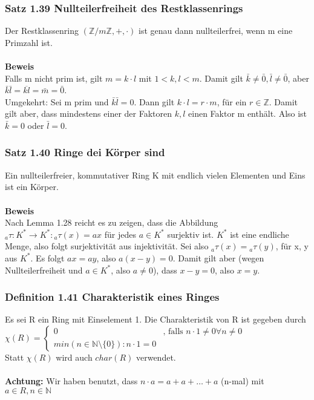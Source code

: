 \documentclass{article}
\newcommand{\N}{\mathbb{N}}
\newcommand{\Z}{\mathbb{Z}}
\begin{document}
\subsubsection{Satz 1.39 Nullteilerfreiheit des Restklassenrings}
Der Restklassenring $(\Z/m\Z, +, \cdot)$ ist genau dann nullteilerfrei, wenn m eine Primzahl ist.\\
\\
\textbf{Beweis}\\
Falls m nicht prim ist, gilt $m = k \cdot l$ mit $1 < k, l < m$. Damit gilt $\bar{k} \neq \bar{0}, \bar{l} \neq \bar{0}$, aber $\bar{k} \bar{l}= \overline{kl} = \bar{m} = \bar{0}$.\\Umgekehrt: Sei m prim und $\bar{k} \bar{l} = 0$. Dann gilt $k \cdot l= r \cdot m$, für ein $r \in \Z$. Damit gilt aber, dass mindestens einer der Faktoren $k, l$ einen Faktor m enthält. Also ist $\bar{k} = 0$ oder $\bar{l} = 0$.

\subsubsection{Satz 1.40 Ringe dei Körper sind}
Ein nullteilerfreier, kommutativer Ring K mit endlich vielen Elementen und Eins ist ein Körper.\\
\\
\textbf{Beweis}\\
Nach Lemma 1.28 reicht es zu zeigen, dass die Abbildung ${}_{a}\tau : K^* \to K^* : {}_{a}\tau(x) = ax$ für jedes $a \in K^*$ surjektiv ist. $K^*$ ist eine endliche Menge, also folgt surjektivität aus injektivität. Sei also ${}_a\tau(x) = {}_a\tau(y)$, für x, y aus $K^*$. Es folgt $ax = ay$, also $a (x - y) = 0$. Damit gilt aber  (wegen Nullteilerfreiheit und $a \in K^*$, also $a \neq 0$), dass $x - y = 0$, also $x = y$.

\subsubsection{Definition 1.41 Charakteristik eines Ringes}
Es sei R ein Ring mit Einselement 1. Die Charakteristik  von R ist gegeben durch\\
$\chi(R) = \begin{cases}
0 & \text{, falls } n \cdot 1 \neq 0 \forall n \neq 0\\
min(n \in \N \setminus \{0\}) : n \cdot 1 = 0
\end{cases}$\\
Statt $\chi(R)$ wird auch $char(R)$ verwendet.\\
\\
\textbf{Achtung:} Wir haben benutzt, dass $n \cdot a = a + a + \dots + a$ (n-mal) mit $a \in R, n \in \N$
\end{document}
